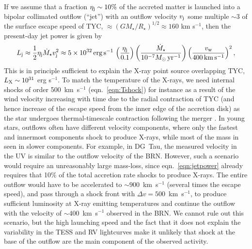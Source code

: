 \documentclass[]{aastex631}
\newcommand{\be}{\begin{equation}}
\newcommand{\ee}{\end{equation}}
\begin{document}
If we assume that a fraction $\eta_{\rm j} \sim 10\%$ of the accreted matter is launched into a bipolar collimated outflow (``jet'') with an outflow velocity $v_{\rm j}$ some multiple $\sim 3$ of the surface escape speed of TYC, $\approx (GM_{\star}/R_{\star})^{1/2} \approx 160$ km s$^{-1}$, then the present-day jet power is given by
\be
L_{\rm j} \approx \frac{1}{2}\eta_{\rm j}\dot{M}_{\star}v_{\rm j}^{2} \approx 5\times 10^{32}\,{\rm erg\,s^{-1}}\,\left(\frac{\eta_{\rm j}}{0.1}\right)\left(\frac{\dot{M}_{\star}}{10^{-7}M_{\odot}\,\rm yr^{-1}}\right)\left(\frac{v_{\rm w}}{400\,{\rm km\,s^{-1}}}\right)^{2},
\label{eqn:jetpower}
\ee
This is in principle sufficient to explain the X-ray point source overlapping TYC, $L_{\rm X} \sim 10^{31}$ erg s$^{-1}$. To match the temperature of the X-rays, we need internal shocks of order 500~km~s$^{-1}$ (eqn.~\ref{eqn:Tshock})
for instance as a result of the wind velocity increasing with time due to the radial contraction of TYC (and hence increase of the escape speed from the inner edge of the accretion disk) as the star undergoes thermal-timescale contraction following the merger \citep[][extended Figure 7]{2020Natur.587..387H}. In young stars, outflows often have different velocity components, where only the fastest and innermost components shock to produce X-rays, while most of the mass in seen in slower components. For example, in DG~Tau, the measured velocity in the UV is similar to the outflow velocity of the BRN. However, such a scenario would require an unreasonably large mass-loss, since eqn.~\ref{eqn:jetpower} already requires that 10\% of the total accretion rate shocks to produce X-rays. The entire outflow would have to be accelerated to $\sim 900$~km~s$^{-1}$ (several times the escape speed), and pass through a shock front with $\Delta v=500$~km~s$^{-1}$, to produce sufficient luminosity at X-ray emitting temperatures and continue the outflow with the velocity of $\sim 400$~km~s$^{-1}$ observed in the BRN. We cannot rule out this scenario, but the high launching speed and the fact that it does not explain the variability in the TESS and RV lightcurves make it unlikely that shock at the base of the outflow are the main component of the observed activity.
\end{document}
